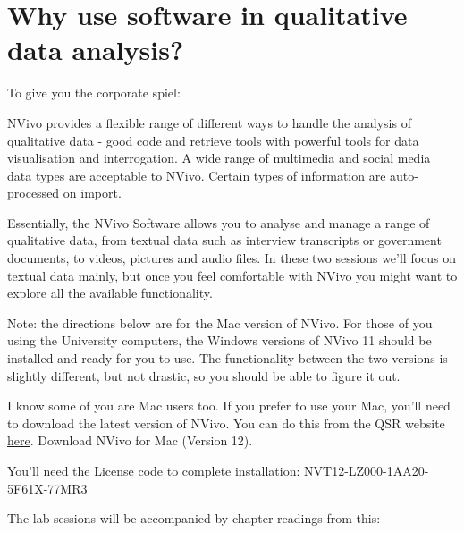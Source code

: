 \documentclass[
]{book}
\begin{document}
\hypertarget{why-use-software-in-qualitative-data-analysis}{%
\section{Why use software in qualitative data analysis?}\label{why-use-software-in-qualitative-data-analysis}}

To give you the corporate spiel:

NVivo provides a flexible range of different ways to handle the analysis of qualitative data - good code and retrieve tools with powerful tools for data visualisation and interrogation. A wide range of multimedia and social media data types are acceptable to NVivo. Certain types of information are auto-processed on import.

Essentially, the NVivo Software allows you to analyse and manage a range of qualitative data, from textual data such as interview transcripts or government documents, to videos, pictures and audio files. In these two sessions we'll focus on textual data mainly, but once you feel comfortable with NVivo you might want to explore all the available functionality.

Note: the directions below are for the Mac version of NVivo. For those of you using the University computers, the Windows versions of NVivo 11 should be installed and ready for you to use. The functionality between the two versions is slightly different, but not drastic, so you should be able to figure it out.

I know some of you are Mac users too. If you prefer to use your Mac, you'll need to download the latest version of NVivo. You can do this from the QSR website \href{http://www.qsrinternational.com/nvivo/support-overview/downloads}{here}. Download NVivo for Mac (Version 12).

You'll need the License code to complete installation: NVT12-LZ000-1AA20-5F61X-77MR3

The lab sessions will be accompanied by chapter readings from this:
\end{document}

